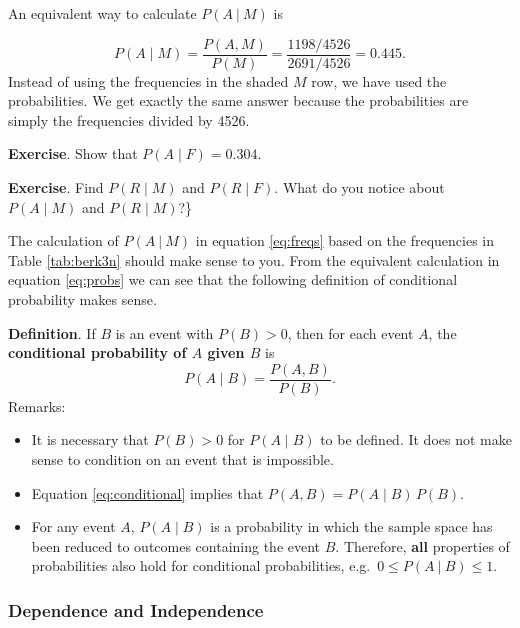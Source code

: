 \documentclass[
  british,
]{book}
\providecommand{\tightlist}{%
  \setlength{\itemsep}{0pt}\setlength{\parskip}{0pt}}
\begin{document}
\FloatBarrier

An equivalent way to calculate \(P(A~|~M)\) is

\begin{equation}
P(A \mid M) = \frac{P(A, M)}{P(M)} = \frac{1198/4526}{2691/4526} = 0.445. \label{eq:probs}
\end{equation}
Instead of using the frequencies in the shaded \(M\) row, we have used the probabilities. We get exactly the same answer because the probabilities are simply the frequencies divided by 4526.

\textbf{Exercise}. Show that \(P(A \mid F)=0.304\).

\textbf{Exercise}. Find \(P(R \mid M)\) and \(P(R \mid F)\). What do you notice about \(P(A \mid M)\) and \(P(R \mid M)\)?\}

The calculation of \(P(A~|~M)\) in equation \eqref{eq:freqs} based on the frequencies in Table \ref{tab:berk3n} should make sense to you. From the equivalent calculation in equation \eqref{eq:probs} we can see that the following definition of conditional probability makes sense.

\textbf{Definition}. If \(B\) is an event with \(P(B) > 0\), then for each event \(A\), the \textbf{conditional probability of \(A\) given \(B\)} is
\begin{equation}
P(A \mid B)=\frac{P(A , B)}{P(B)}.
\label{eq:conditional}
\end{equation}
Remarks:

\begin{itemize}
\tightlist
\item
  It is necessary that \(P(B) > 0\) for \(P(A \mid B)\) to be defined. It does not make sense to condition on an event that is impossible.
\item
  Equation \eqref{eq:conditional} implies that \(P(A , B) = P(A \mid B)\,P(B)\).
\item
  For any event \(A\), \(P(A \mid B)\) is a probability in which the sample space has been reduced to outcomes containing the event \(B\). Therefore, \textbf{all} properties of probabilities also hold for conditional probabilities, e.g.~\(0 \leq P(A~|~B) \leq 1\).
\end{itemize}

\hypertarget{dependence-and-independence}{%
\subsubsection*{Dependence and Independence}\label{dependence-and-independence}}
\end{document}
